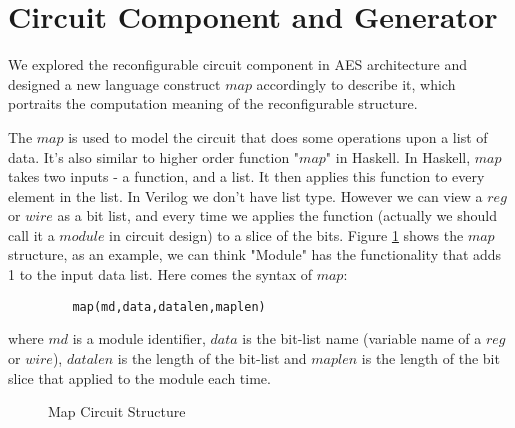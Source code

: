 \section{Circuit Component and Generator}\label{sec:syntax}
We explored the reconfigurable circuit component in AES architecture and designed a
new language construct $map$ accordingly to describe it, which portraits the computation 
meaning of the reconfigurable structure.

The $map$ is used to model the circuit that does some operations upon a list of data. It's also similar to higher order function "$map$" in Haskell. In Haskell, $map$ takes two inputs - a function, and a list. It then applies this function to every element in the list. In Verilog we don't have list type. However we can view a $reg$ or $wire$ as a bit list, and every time we applies the function (actually we should call it a $module$ in circuit design) to a slice of the bits. Figure \ref{fig-map} shows the $map$ structure, as an example, we can think  "Module" has the functionality that adds 1 to the input data list. Here comes the syntax of $map$:

\begin{verbatim}
         map(md,data,datalen,maplen)
\end{verbatim}
where $md$ is a module identifier, $data$ is the bit-list name (variable name of a $reg$ or $wire$), $datalen$ is the length of the bit-list and $maplen$ is the length of the bit slice that applied to the module each time.
\begin{figure}[ht]
\centering
{}
\caption{Map Circuit Structure}
\label{fig-map}
\end{figure}